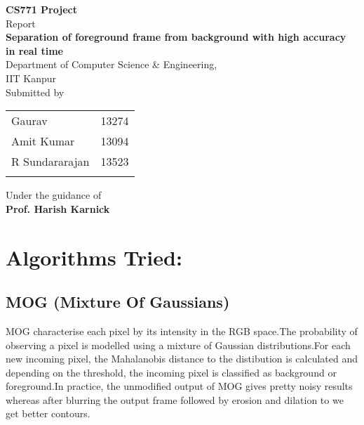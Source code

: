 \documentclass[12pt,a4paper]{report}
\begin{document}
\renewcommand\bibname{References} 

\begin{titlepage}

\begin{center}

\textup{\small {\bf CS771 Project} \\ Report}\\[0.2in]

\Large \textbf {Separation of foreground frame from background with  high
accuracy in real time}\\[0.5in]
{Department of Computer Science \& Engineering, \\IIT Kanpur }\\[0.2in]

\normalsize Submitted by \\
\begin{table}[h]
\centering
\begin{tabular}{lr} 
Gaurav & 13274 \\
Amit Kumar& 13094 \\
R Sundararajan& 13523\\ \\ 
\end{tabular}
\end{table}

\vspace{.1in}
Under the guidance of\\
{\textbf{Prof. Harish Karnick}}\\[0.2in]

\end{center}
\end{titlepage}

\section*{Algorithms Tried:}
\subsection*{MOG (Mixture Of Gaussians)}
MOG characterise each pixel by its intensity in the RGB space.The probability of observing a pixel is modelled using a mixture of Gaussian distributions.For each new incoming pixel, the Mahalanobis distance to the distibution is calculated and depending on the threshold, the incoming pixel is classified as background or foreground.In practice, the unmodified output of MOG gives pretty noisy results whereas after blurring the output frame followed by erosion and dilation to we get better contours. 
\end{document}
